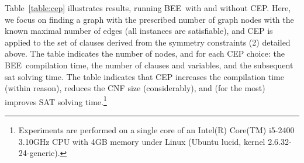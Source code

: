 \documentclass[runningheads,a4paper]{llncs}
\newcommand{\bee}{\textsf{BEE}}
\begin{document}
Table~\ref{table:cep} illustrates results, running \bee\ with and
without CEP. Here, we focus on finding a graph with the prescribed
number of graph nodes with the known maximal number of edges (all
instances are satisfiable), and CEP is applied to the set of clauses
derived from the symmetry constraints (2) detailed above.  The table
indicates the number of nodes, and for each CEP choice: the \bee\
compilation time, the number of clauses and variables, and the
subsequent sat solving time.  The table indicates that CEP increases
the compilation time (within reason), reduces the CNF size
(considerably), and (for the most) improves SAT solving
time.\footnote{\label{machine}Experiments are performed on a single
  core of an Intel(R) Core(TM) i5-2400 3.10GHz CPU with 4GB memory
  under Linux (Ubuntu lucid, kernel 2.6.32-24-generic).}
\end{document}
